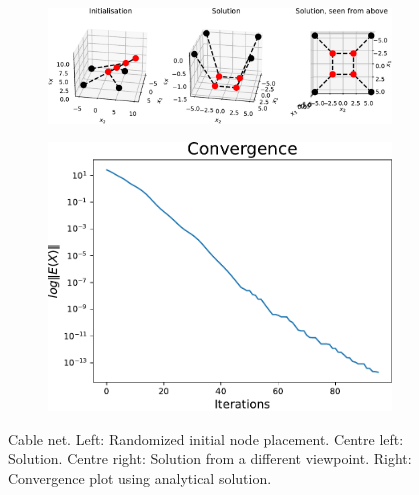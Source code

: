 \begin{figure}[!ht]
\centering
\begin{subfigure}{.72\textwidth}
  \centering
  \includegraphics[width=0.99\linewidth]{Bilder/p25.pdf}
\end{subfigure}%
\begin{subfigure}{.3\textwidth}
  \centering
  \includegraphics[width=0.99\linewidth]{Bilder/P25conv.pdf}
\end{subfigure}
\caption{Cable net. Left: Randomized initial node placement. Centre left: Solution. Centre right: Solution from a different viewpoint. Right: Convergence plot using analytical solution.}
\label{P25}
\end{figure}

